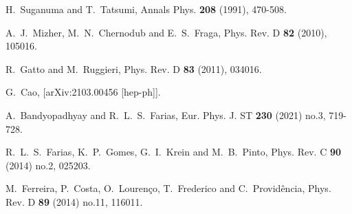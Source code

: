 \begin{thebibliography}{1000}
H.~Suganuma and T.~Tatsumi,
Annals Phys. \textbf{208} (1991), 470-508.



A.~J.~Mizher, M.~N.~Chernodub and E.~S.~Fraga,
Phys. Rev. D \textbf{82} (2010), 105016.

R.~Gatto and M.~Ruggieri,
Phys. Rev. D \textbf{83} (2011), 034016.

G.~Cao,
[arXiv:2103.00456 [hep-ph]].

A.~Bandyopadhyay and R.~L.~S.~Farias,
Eur. Phys. J. ST \textbf{230} (2021) no.3, 719-728.


R.~L.~S.~Farias, K.~P.~Gomes, G.~I.~Krein and M.~B.~Pinto,
Phys. Rev. C \textbf{90} (2014) no.2, 025203.


M.~Ferreira, P.~Costa, O.~Louren\c{c}o, T.~Frederico and C.~Provid\^encia,
Phys. Rev. D \textbf{89} (2014) no.11, 116011.


\end{thebibliography}
